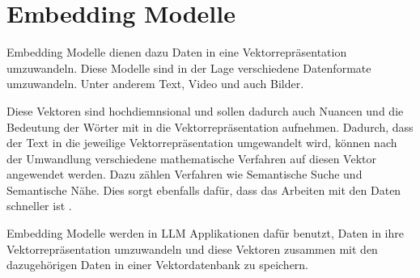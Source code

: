 \section{Embedding Modelle}
\label{s:intr:emb}
Embedding Modelle dienen dazu Daten in eine Vektorrepräsentation umzuwandeln.
Diese Modelle sind in der Lage verschiedene Datenformate umzuwandeln. Unter anderem
Text, Video und auch Bilder. \par
Diese Vektoren sind hochdiemnsional und sollen dadurch auch Nuancen und die Bedeutung 
der Wörter mit in die Vektorrepräsentation aufnehmen. Dadurch, dass der Text
in die jeweilige Vektorrepräsentation umgewandelt wird, können nach der Umwandlung
verschiedene mathematische Verfahren auf diesen Vektor angewendet werden. 
Dazu zählen Verfahren wie Semantische Suche und Semantische Nähe.
Dies sorgt ebenfalls dafür, dass das Arbeiten mit den Daten schneller ist \cite{leeNVEmbedImprovedTechniques2024, mikolovDistributedRepresentationsWords2013, NVIDIAGlossaryWhat}.\par
Embedding Modelle werden in LLM Applikationen dafür benutzt, Daten in ihre 
Vektorrepräsentation umzuwandeln und diese Vektoren zusammen mit den 
dazugehörigen Daten in einer Vektordatenbank zu speichern.  
\cite{leeNVEmbedImprovedTechniques2024, mikolovDistributedRepresentationsWords2013, NVIDIAGlossaryWhat}

